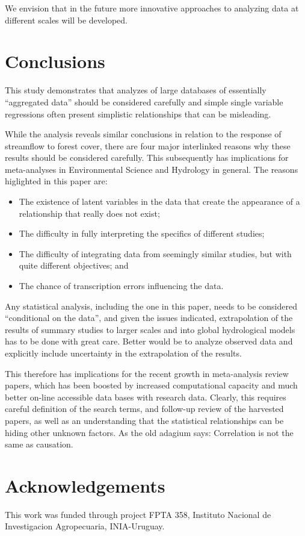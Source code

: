 \documentclass[]{elsarticle} %
\providecommand{\tightlist}{%
  \setlength{\itemsep}{0pt}\setlength{\parskip}{0pt}}
\begin{document}
We envision that in the future more innovative approaches to analyzing data at different scales will be developed.

\hypertarget{conclusions}{%
\section{Conclusions}\label{conclusions}}

This study demonstrates that analyzes of large databases of essentially ``aggregated data'' should be considered carefully and simple single variable regressions often present simplistic relationships that can be misleading.

While the analysis reveals similar conclusions in relation to the response of streamflow to forest cover, there are four major interlinked reasons why these results should be considered carefully. This subsequently has implications for meta-analyses in Environmental Science and Hydrology in general. The reasons higlighted in this paper are:

\begin{itemize}
\tightlist
\item
  The existence of latent variables in the data that create the appearance of a relationship that really does not exist;\\
\item
  The difficulty in fully interpreting the specifics of different studies;\\
\item
  The difficulty of integrating data from seemingly similar studies, but with quite different objectives; and\\
\item
  The chance of transcription errors influencing the data.
\end{itemize}

Any statistical analysis, including the one in this paper, needs to be considered ``conditional on the data'', and given the issues indicated, extrapolation of the results of summary studies to larger scales and into global hydrological models has to be done with great care. Better would be to analyze observed data and explicitly include uncertainty in the extrapolation of the results.

This therefore has implications for the recent growth in meta-analysis review papers, which has been boosted by increased computational capacity and much better on-line accessible data bases with research data. Clearly, this requires careful definition of the search terms, and follow-up review of the harvested papers, as well as an understanding that the statistical relationships can be hiding other unknown factors. As the old adagium says: Correlation is not the same as causation.

\hypertarget{acknowledgements}{%
\section{Acknowledgements}\label{acknowledgements}}

This work was funded through project FPTA 358, Instituto Nacional de Investigacion Agropecuaria, INIA-Uruguay.

\renewcommand\refname{References}

\end{document}
